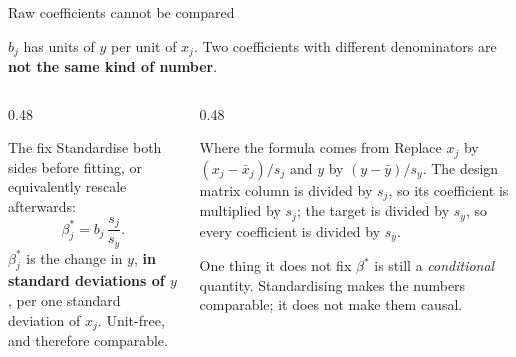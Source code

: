 \documentclass[aspectratio=169]{beamer}
\begin{document}
\begin{frame}[shrink=6]{Raw coefficients cannot be compared}
  \begin{alertblock}{}
    \centering
    $b_j$ has units of $y$ per unit of $x_j$. Two coefficients with different
    denominators are \textbf{not the same kind of number}.
  \end{alertblock}
  \vspace{0.3em}
  \begin{columns}[T]
    \begin{column}{0.48\textwidth}
      \begin{block}{The fix}
        Standardise both sides before fitting, or equivalently rescale
        afterwards:
        \[ \beta^*_j = b_j\,\frac{s_j}{s_y} . \]
        \small $\beta^*_j$ is the change in $y$, \textbf{in standard
        deviations of $y$}, per one standard deviation of $x_j$. Unit-free,
        and therefore comparable.
      \end{block}
    \end{column}
    \begin{column}{0.48\textwidth}
      \begin{block}{Where the formula comes from}
        \small Replace $x_j$ by $(x_j - \bar x_j)/s_j$ and $y$ by
        $(y-\bar y)/s_y$. The design matrix column is divided by $s_j$, so
        its coefficient is multiplied by $s_j$; the target is divided by
        $s_y$, so every coefficient is divided by $s_y$.
      \end{block}
      \begin{alertblock}{One thing it does not fix}
        \small $\beta^*$ is still a \emph{conditional} quantity. Standardising
        makes the numbers comparable; it does not make them causal.
      \end{alertblock}
    \end{column}
  \end{columns}
\end{frame}
\end{document}
